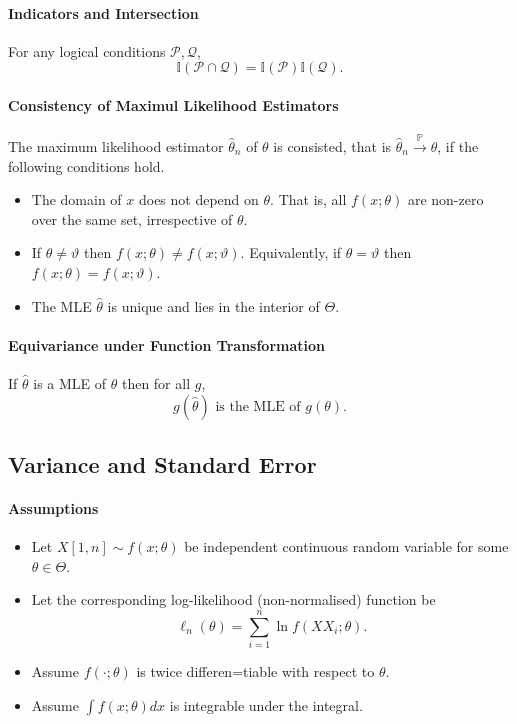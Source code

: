 \paragraph{Indicators and Intersection}
For any logical conditions \(\mathcal{P}, \mathcal{Q}\), \[
  \mathbb{I}(\mathcal{P} \cap \mathcal{Q}) = \mathbb{I}(\mathcal{P})\mathbb{I}(\mathcal{Q})
.\] 

\paragraph{Consistency of Maximul Likelihood Estimators}
The maximum likelihood estimator \(\hat{\theta}_n\) of \(\theta\)
is consisted, that is \(\hat{\theta}_n \xrightarrow{\mathbb{P}} \theta\),
if the following conditions hold.
\begin{itemize}
  \item The domain of \(x\) does not depend on  \(\theta\). That is,  all \(f(x; \theta)\)
    are non-zero over the same set, irrespective of \(\theta\).
  \item If \(\theta \neq \vartheta\) then \( f(x; \theta) \neq f(x; \vartheta)\).
    Equivalently, if  \(\theta = \vartheta\) then \(f(x; \theta) = f(x; \vartheta)\).
  \item The MLE \(\hat{\theta}\) is unique and lies in the interior of \(\Theta\).
\end{itemize}

\paragraph{Equivariance under Function Transformation}
If \(\hat{\theta}\) is a MLE of \(\theta\) then for all \(g\),  \[
  g(\hat{\theta}) \text{ is the MLE of } g(\theta)
.\] 


\subsection{Variance and Standard Error}
\paragraph{Assumptions}
\begin{itemize}
  \item Let \(X[1, n] \sim f(x; \theta)\) be independent continuous random variable for some  \(\theta \in  \Theta\).
  \item Let the corresponding log-likelihood (non-normalised) function be \[
      \ell_n(\theta) = \sum_{i = 1}^n \ln f(XX_i; \theta)
    .\]
  \item Assume \(f(\cdot ; \theta)\) is twice differen=tiable with respect to \(\theta\).
  \item Assume \(\int f(x; \theta) dx\) is integrable under the integral.
\end{itemize}

